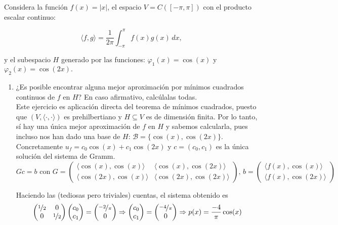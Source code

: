 \documentclass[12pt]{article}
\begin{document}
	\begin{ejercicio}[4 puntos]
		Considera la función $f(x) = |x|$, el espacio $V = C\left([-\pi, \pi]\right)$ con el producto escalar continuo:
		
		$$\langle f, g \rangle = \frac{1}{2\pi} \int_{-\pi}^{\pi} f(x)g(x) \, dx,$$
		
		y el subespacio $H$ generado por las funciones: $\varphi_1(x) = \cos(x)$ y $\varphi_2(x) = \cos(2x).$
		
		\begin{enumerate}[label=\alph*)]
			\item ¿Es posible encontrar alguna mejor aproximación por mínimos cuadrados continuos de $f$ en $H$? En caso afirmativo, calcúlalas todas.\\
			
				Este ejercicio es aplicación directa del teorema de mínimos cuadrados, puesto que $(V, \langle \cdot, \cdot \rangle)$ es prehilbertiano y $H \subseteq V$ es de dimensión finita. Por lo tanto, sí hay una única mejor aproximación de $f$ en $H$ y sabemos calcularla, pues incluso nos han dado una base de $H$: $\mathcal{B} = \{\cos(x), \cos(2x)\}$. Concretamente $\boxed{u_f = c_0 \cos(x) + c_1 \cos(2x)}$ y $c = (c_0, c_1)$ es la única solución del sistema de Gramm.
				$$Gc = b \text{ con } G = 
				\begin{pmatrix}
					\langle \cos(x), \cos(x) \rangle & \langle \cos(x), \cos(2x) \rangle \\
					\langle \cos(2x), \cos(x) \rangle & \langle \cos(2x), \cos(2x) \rangle
				\end{pmatrix}, \, b = 
				\begin{pmatrix}
					\langle f(x), \cos(x) \rangle \\
					\langle f(x), \cos(2x) \rangle
				\end{pmatrix}$$
				
				Haciendo las (tediosas pero triviales) cuentas, el sistema obtenido es
				$$\begin{pmatrix}
					\nicefrac{1}{2} & 0 \\ 
					0 & \nicefrac{1}{2}
				\end{pmatrix}
				\begin{pmatrix}
					c_0 \\
					c_1
				\end{pmatrix}
				=
				\begin{pmatrix}
					\nicefrac{-2}{\pi}\\
					0
				\end{pmatrix} \Rightarrow 
				\begin{pmatrix}
					c_0 \\
					c_1
				\end{pmatrix}
				=
				\begin{pmatrix}
					\nicefrac{-4}{\pi} \\
					0
				\end{pmatrix} \Rightarrow p(x) = \frac{-4}{\pi} \cos(x) $$
				

\end{enumerate}
\end{ejercicio}
\end{document}

